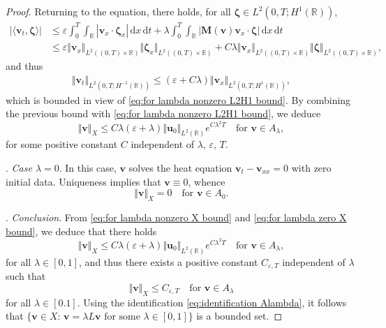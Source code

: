 \documentclass[11pt,a4paper,reqno]{amsart}
\numberwithin{equation}{section}
\theoremstyle{definition}
\theoremstyle{remark}
\newcommand{\bu}{\mathbf{u}}
\newcommand{\bv}{\mathbf{v}}
\renewcommand{\d}{\, \mathrm{d}}
\newcommand{\bM}{\mathbf{M}}
\newcommand{\bzeta}{\boldsymbol{\zeta}}
\renewcommand{\leq}{\leqslant}
\begin{document}
{\begin{proof}
Returning to the equation, there holds, for all $\bzeta \in L^2(0,T;H^1(\mathbb{R}))$, 
\begin{equation*}
   \begin{aligned} |\langle \bv_t , \bzeta \rangle | &\leq \varepsilon \int_0^T \int_\mathbb{R} |\bv_x \cdot \bzeta_x| \d x \d t + \lambda \int_0^T \int_\mathbb{R} |\bM(\bv) \bv_x \cdot \bzeta| \d x \d t \\ 
   &\leq \varepsilon \Vert \bv_x \Vert_{L^2((0,T)\times\mathbb{R})}\Vert \bzeta_x \Vert_{L^2((0,T)\times\mathbb{R})} + C\lambda \Vert \bv_x \Vert_{L^2((0,T)\times\mathbb{R})} \Vert \bzeta \Vert_{L^2((0,T)\times\mathbb{R})}, 
   \end{aligned}
\end{equation*}
and thus 
\begin{equation*}
   \begin{aligned} \Vert \bv_t \Vert_{L^2(0,T;H^{-1}(\mathbb{R}))} \leq (\varepsilon + C\lambda) \Vert \bv_x \Vert_{L^2(0,T;H^1(\mathbb{R}))}, 
   \end{aligned}
\end{equation*}
which is bounded in view of \eqref{eq:for lambda nonzero L2H1 bound}. By combining the previous bound with \eqref{eq:for lambda nonzero L2H1 bound}, we deduce 
\begin{equation}\label{eq:for lambda nonzero X bound}
    \Vert \bv \Vert_{X} \leq C\lambda(\varepsilon+\lambda) \Vert \bu_0 \Vert_{L^2(\mathbb{R})} e^{C \lambda^2 T} \quad \text{for } \bv \in A_\lambda, 
\end{equation}
for some positive constant $C$ independent of $\lambda, \, \varepsilon, \, T$. 

\smallskip 

. \textit{Case $\lambda = 0$}. In this case, $\bv$ solves the heat equation $\bv_t - \bv_{xx}=0$ with zero initial data. Uniqueness implies that $\bv \equiv 0$, whence 
\begin{equation}\label{eq:for lambda zero X bound}
    \Vert \bv \Vert_X = 0 \quad \text{for } \bv \in A_0. 
\end{equation}

\smallskip 

. \textit{Conclusion}. From \eqref{eq:for lambda nonzero X bound} and \eqref{eq:for lambda zero X bound}, we deduce that there holds 
\begin{equation*}
    \Vert \bv \Vert_{X} \leq C\lambda(\varepsilon+\lambda) \Vert \bu_0 \Vert_{L^2(\mathbb{R})} e^{C \lambda^2 T} \quad \text{for } \bv \in A_\lambda, 
\end{equation*}
for all $\lambda \in [0,1]$, and thus there exists a positive constant $C_{\varepsilon,T}$ independent of $\lambda$ such that 
\begin{equation*}
    \Vert \bv \Vert_{X} \leq C_{\varepsilon,T} \quad \text{for } \bv \in A_\lambda 
\end{equation*}
for all $\lambda \in [0.1]$. Using the identification \eqref{eq:identification Alambda}, it follows that $ \big\{ \bv \in X : \, \bv = \lambda L\bv \text{ for some } \lambda \in [0,1] \big\} $ is a bounded set. 
\end{proof}

}
\end{document}
